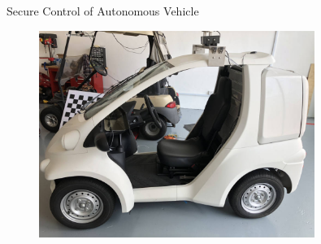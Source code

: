 \documentclass[10pt]{beamer}
\begin{document}
\begin{frame}{Secure Control of Autonomous Vehicle}
\begin{figure}[ht]
  \centering
  \includegraphics[width=0.8\textwidth]{singpilot.jpg}
\end{figure}

\end{frame}
\end{document}

